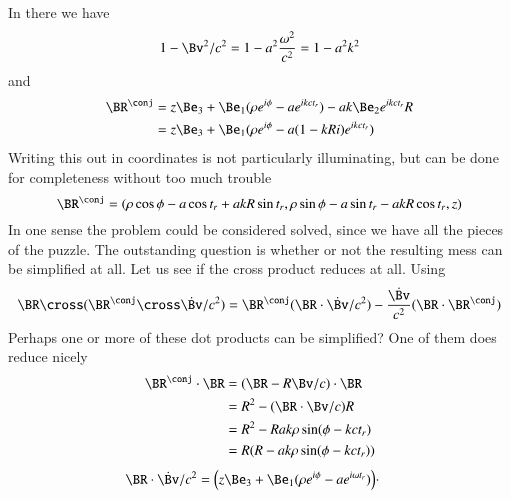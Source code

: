 {In there we have
%
\begin{equation}\label{eqn:relativisticElectrodynamicsExamReflection:580}
1 - \Bv^2/c^2 = 1 - a^2 \frac{\omega^2}{c^2} = 1 - a^2 k^2
\end{equation}
%
and
%
\begin{equation}\label{eqn:relativisticElectrodynamicsExamReflection:1090}
\begin{aligned}
\BR^\conj
&=
z \Be_3 + \Be_1 (\rho e^{i \phi} - a e^{i k c t_r} )
-
a k \Be_2 e^{i k c t_r} R \\
&=
z \Be_3 + \Be_1 (\rho e^{i \phi} - a (1 - k R i) e^{i k c t_r} )
\end{aligned}
\end{equation}
%
Writing this out in coordinates is not particularly illuminating, but can be done for completeness without too much trouble
%
\begin{equation}\label{eqn:relativisticElectrodynamicsExamReflection:600}
\BR^\conj =
( \rho \cos\phi - a \cos t_r + a k R \sin t_r,
  \rho \sin\phi - a \sin t_r - a k R \cos t_r,
  z )
\end{equation}
%
In one sense the problem could be considered solved, since we have all the pieces of the puzzle.  The outstanding question is whether or not the resulting mess can be simplified at all.  Let us see if the cross product reduces at all.  Using
%
\begin{equation}\label{eqn:relativisticElectrodynamicsExamReflection:620}
\BR \cross (\BR^\conj \cross \dot{\Bv}/c^2)
=
\BR^\conj (\BR \cdot \dot{\Bv}/c^2)
- \frac{\dot{\Bv}}{c^2}
(\BR \cdot \BR^\conj)
\end{equation}
%
Perhaps one or more of these dot products can be simplified?  One of them does reduce nicely
%
\begin{equation}\label{eqn:relativisticElectrodynamicsExamReflection:1110}
\begin{aligned}
\BR^\conj \cdot \BR
&= ( \BR - R \Bv/c ) \cdot \BR  \\
&= R^2 - (\BR \cdot \Bv/c) R \\
&= R^2 - R a k \rho \sin(\phi - k c t_r) \\
&= R(R - a k \rho \sin(\phi - k c t_r))
\end{aligned}
\end{equation}
%
\begin{equation}\label{eqn:relativisticElectrodynamicsExamReflection:1130}
\begin{aligned}
\BR \cdot \dot{\Bv}/c^2
&=
\Bigl(z \Be_3 + \Be_1 (\rho e^{i \phi} - a e^{i \omega t_r} ) \Bigr) \cdot

\end{aligned}
\end{equation}}
